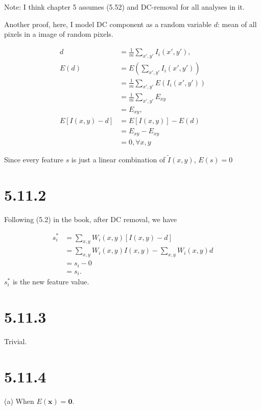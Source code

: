 \documentclass[12pt]{article}
\newcommand{\vect}[1]{\boldsymbol{#1}}
\begin{document}
Note: I think chapter 5 assumes (5.52) and DC-removal for all analyses in it.


Another proof, here, I model DC component as a random variable $d$: mean of all pixels in a image of random pixels.

\begin{align}
d & =  \frac{1}{m} \sum_{x',y'} I_i(x',y'), \\
E(d) & = E ( \sum_{x',y'} I_i(x',y') )\\
     & = \frac{1}{m}  \sum_{x',y'} E (  I_i(x',y') ) \\
     & = \frac{1}{m} \sum_{x',y'}  E_{xy} \\
     &=  E_{xy},\\
E[I(x,y) - d] & = E[I(x,y)] - E(d) \\
              & = E_{xy} - E_{xy}\\
              & = 0, \forall x,y
\end{align}

Since every feature $s$ is just a linear combination of $\tilde{I}(x,y)$, $E(s) = 0$

\section*{5.11.2} %
\label{sec:5_11_2}

Following (5.2) in the book, after DC removal, we have

\begin{align}
s_i^*   &=  \sum_{x,y} W_i(x,y) [I(x,y) - d] \\
        & = \sum_{x,y} W_i(x,y) I(x,y) - \sum_{x,y} W_i(x,y)  d \\
        & = s_i - 0 \\
        & = s_i.
\end{align}
$s_i^*$ is the new feature value.


\section*{5.11.3} %
\label{sec:5_11_3}
Trivial.


\section*{5.11.4} %
\label{sec:5_11_4}
(a) When $E(\vect{x}) = \vect{0}$.
\end{document}
